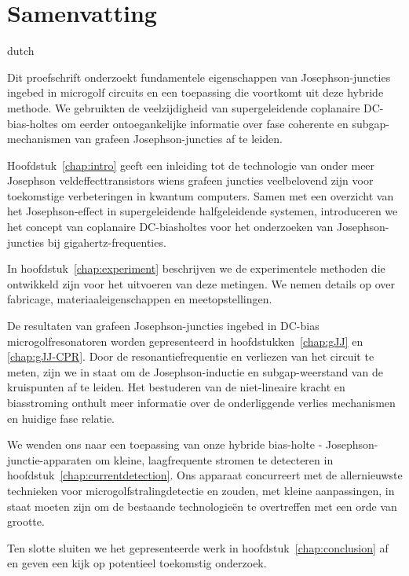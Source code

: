 
\chapter*{Samenvatting}

\begin{otherlanguage*}{dutch}%

Dit proefschrift onderzoekt fundamentele eigenschappen van Josephson-juncties ingebed in microgolf circuits en een toepassing die voortkomt uit deze hybride methode.
%
We gebruikten de veelzijdigheid van supergeleidende coplanaire DC-bias-holtes om eerder ontoegankelijke informatie over fase coherente en subgap-mechanismen van grafeen Josephson-juncties af te leiden.

\noindent\newline
Hoofdstuk~\ref{chap:intro} geeft een inleiding tot de technologie van onder meer Josephson veldeffecttransistors wiens grafeen juncties veelbelovend zijn voor toekomstige verbeteringen in kwantum computers.
%
Samen met een overzicht van het Josephson-effect in supergeleidende halfgeleidende systemen, introduceren we het concept van coplanaire DC-biasholtes voor het onderzoeken van Josephson-juncties bij gigahertz-frequenties.

\noindent\newline
In hoofdstuk~\ref{chap:experiment} beschrijven we de experimentele methoden die ontwikkeld zijn voor het uitvoeren van deze metingen.
%
We nemen details op over fabricage, materiaaleigenschappen en meetopstellingen.


\noindent\newline
De resultaten van grafeen Josephson-juncties ingebed in DC-bias microgolfresonatoren worden gepresenteerd in hoofdstukken~\ref{chap:gJJ} en \ref{chap:gJJ-CPR}.
%
Door de resonantiefrequentie en verliezen van het circuit te meten, zijn we in staat om de Josephson-inductie en subgap-weerstand van de kruispunten af te leiden.
%
Het bestuderen van de niet-lineaire kracht en biasstroming onthult meer informatie over de onderliggende verlies mechanismen en huidige fase relatie.


\noindent\newline
We wenden ons naar een toepassing van onze hybride bias-holte - Josephson-junctie-apparaten om kleine, laagfrequente stromen te detecteren in hoofdstuk~\ref{chap:currentdetection}.
%
Ons apparaat concurreert met de allernieuwste technieken voor microgolfstralingdetectie en zouden, met kleine aanpassingen, in staat moeten zijn om de bestaande technologieën te overtreffen met een orde van grootte.


\noindent\newline
Ten slotte sluiten we het gepresenteerde werk in hoofdstuk~\ref{chap:conclusion} af en geven een kijk op potentieel toekomstig onderzoek.

\end{otherlanguage*}

